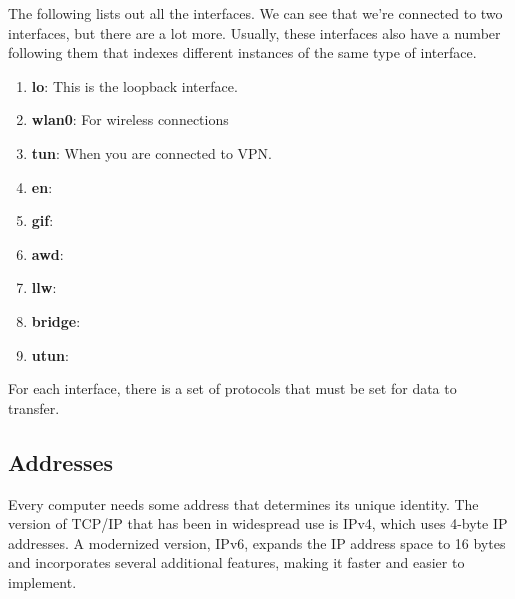 \documentclass{article}
\theoremstyle{definition}
\begin{document}
    The following lists out all the interfaces. We can see that we're connected to two interfaces, but there are a lot more. Usually, these interfaces also have a number following them that indexes different instances of the same type of interface. 

    \begin{enumerate} 
      \item \textbf{lo}: This is the loopback interface. 
      \item \textbf{wlan0}: For wireless connections 
      \item \textbf{tun}: When you are connected to VPN. 
      \item \textbf{en}: 
      \item \textbf{gif}: 
      \item \textbf{awd}: 
      \item \textbf{llw}: 
      \item \textbf{bridge}: 
      \item \textbf{utun}: 
    \end{enumerate}

    For each interface, there is a set of protocols that must be set for data to transfer. 

  \subsection{Addresses}

    Every computer needs some address that determines its unique identity. The version of TCP/IP that has been in widespread use is IPv4, which uses 4-byte IP addresses. A modernized version, IPv6, expands the IP address space to 16 bytes and incorporates several additional features, making it faster and easier to implement. 
\end{document}
